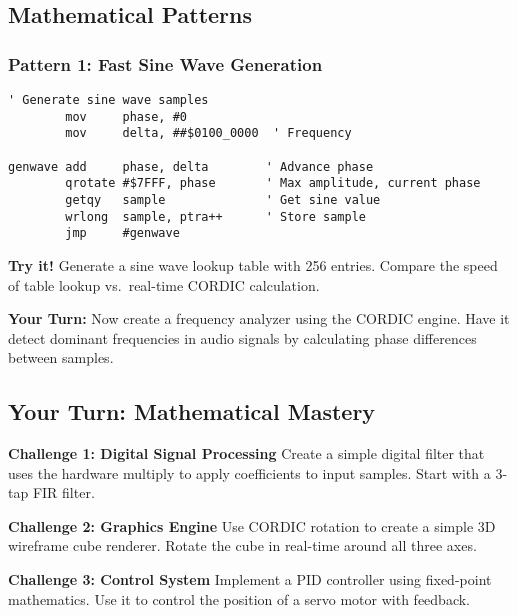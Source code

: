 \documentclass[11pt]{book}
\begin{document}
\hypertarget{mathematical-patterns}{%
\subsection{Mathematical Patterns}\label{mathematical-patterns}}

\hypertarget{pattern-1-fast-sine-wave-generation}{%
\subsubsection{Pattern 1: Fast Sine Wave
Generation}\label{pattern-1-fast-sine-wave-generation}}

\begin{lstlisting}
' Generate sine wave samples
        mov     phase, #0
        mov     delta, ##$0100_0000  ' Frequency
        
genwave add     phase, delta        ' Advance phase
        qrotate #$7FFF, phase       ' Max amplitude, current phase
        getqy   sample              ' Get sine value
        wrlong  sample, ptra++      ' Store sample
        jmp     #genwave
\end{lstlisting}

\textbf{Try it!} Generate a sine wave lookup table with 256 entries.
Compare the speed of table lookup vs.~real-time CORDIC calculation.

\textbf{Your Turn:} Now create a frequency analyzer using the CORDIC
engine. Have it detect dominant frequencies in audio signals by
calculating phase differences between samples.

\hypertarget{your-turn-mathematical-mastery}{%
\subsection{Your Turn: Mathematical
Mastery}\label{your-turn-mathematical-mastery}}

\begin{yourturn}
\textbf{Challenge 1: Digital Signal Processing}
Create a simple digital filter that uses the hardware multiply to apply coefficients to input samples. Start with a 3-tap FIR filter.
\end{yourturn}

\begin{yourturn}
\textbf{Challenge 2: Graphics Engine}
Use CORDIC rotation to create a simple 3D wireframe cube renderer. Rotate the cube in real-time around all three axes.
\end{yourturn}

\begin{yourturn}
\textbf{Challenge 3: Control System}
Implement a PID controller using fixed-point mathematics. Use it to control the position of a servo motor with feedback.
\end{yourturn}
\end{document}

